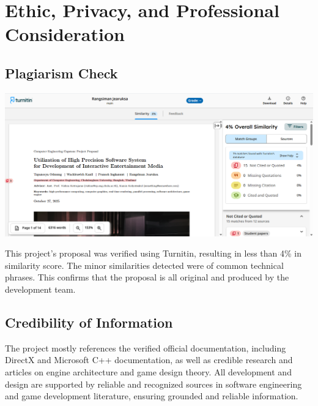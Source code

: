 \section{Ethic, Privacy, and Professional Consideration}
\label{sec:ethic-privacy-and-professional-consideration}

\subsection{Plagiarism Check}
\label{subsec:plagiarism-check}

\vspace{0.5cm}

\noindent
\begin{minipage}{\columnwidth}
    \centering
    \includegraphics[width=\columnwidth, keepaspectratio]{images/turnitin}
    \label{fig:plagiarism-check}
\end{minipage}

\vspace{0.5cm}

\noindent This project's proposal was verified using Turnitin, resulting in less than 4\% in similarity score.
The minor similarities detected were of common technical phrases.
This confirms that the proposal is all original and produced by the development team.

\subsection{Credibility of Information}
\label{subsec:credibility-of-information}

The project mostly references the verified official documentation, including DirectX and Microsoft C++ documentation,
as well as credible research and articles on engine architecture and game design theory.
All development and design are supported by reliable and recognized sources in software engineering and game development literature,
ensuring grounded and reliable information.

